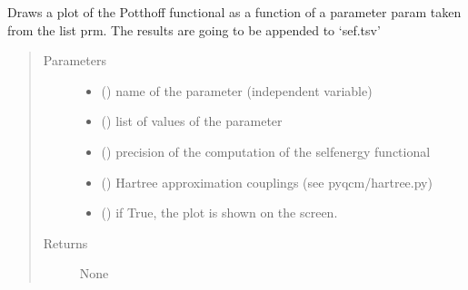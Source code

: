 \documentclass[letterpaper,10pt,english]{sphinxmanual}
\begin{document}

\begin{fulllineitems}
\label{\detokenize{vca:pyqcm.vca.plot_sef}}
\sphinxAtStartPar
Draws a plot of the Potthoff functional as a function of a parameter param taken from the list prm. The results are going to be appended to ‘sef.tsv’
\begin{quote}\begin{description}
\item[{Parameters}] \leavevmode\begin{itemize}
\item {} 
\sphinxAtStartPar
{} () \textendash{} name of the parameter (independent variable)

\item {} 
\sphinxAtStartPar
{} (\sphinxstyleliteralemphasis{\sphinxupquote{{[}}}\sphinxstyleliteralemphasis{\sphinxupquote{{]}}}) \textendash{} list of values of the parameter

\item {} 
\sphinxAtStartPar
{} () \textendash{} precision of the computation of the self\sphinxhyphen{}energy functional

\item {} 
\sphinxAtStartPar
{} (\sphinxstyleliteralemphasis{\sphinxupquote{(}}\sphinxstyleliteralemphasis{\sphinxupquote{)}}) \textendash{} Hartree approximation couplings (see pyqcm/hartree.py)

\item {} 
\sphinxAtStartPar
{} () \textendash{} if True, the plot is shown on the screen.

\end{itemize}

\item[{Returns}] \leavevmode
\sphinxAtStartPar
None

\end{description}\end{quote}

\end{fulllineitems}
\end{document}
